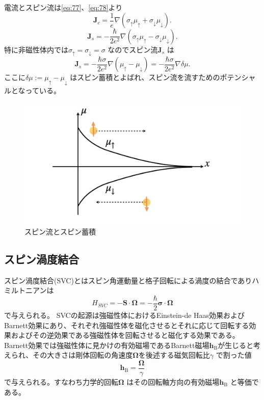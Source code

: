 \documentclass[dvipdfmx,11pt]{jsreport}
\numberwithin{equation}{chapter}
\numberwithin{table}{chapter}
\begin{document}
電流とスピン流は\eqref{eq:77}、\eqref{eq:78}より
\begin{equation}
\label{eq:86}
	\bm{J}_c=\frac{1}{e}\nabla (\sigma_{\uparrow}\mu_{\uparrow}+\sigma_{\downarrow}\mu_{\downarrow})
.\end{equation}
\begin{equation}
\label{eq:87}
	\bm{J}_s=-\frac{\hbar}{2e^2}\nabla (\sigma_{\uparrow}\mu_{\uparrow}-\sigma_{\downarrow}\mu_{\downarrow})
.\end{equation}
特に非磁性体内では$\sigma_{\uparrow}=\sigma_{\downarrow}=\sigma$ なのでスピン流$\bm{J}_{s}$ は
\begin{equation}
\label{eq:88}
	\bm{J}_s=-\frac{\hbar\sigma}{2e^2}\nabla (\mu_{\uparrow}-\mu_{\downarrow})=-\frac{\hbar\sigma}{2e^2}\nabla \delta\mu
.\end{equation}
ここに$\delta\mu:=\mu_{\uparrow}-\mu_{\downarrow}$ はスピン蓄積とよばれ、スピン流を流すためのポテンシャルとなっている。

\begin{figure}[H]
	\centering
	\includegraphics[width=\textwidth]{fig/fig.006.jpeg}
	\caption{スピン流とスピン蓄積}
	\label{fig:fig-fig-006-jpeg}
\end{figure}
\subsection{スピン渦度結合}
スピン渦度結合(SVC)とはスピン角運動量と格子回転による渦度の結合でありハミルトニアンは
\begin{equation}
\label{eq:s1}
	H_{SVC}=-\bm{S}\cdot \bm{\Omega}=-\frac{\hbar}{2}\bm{\sigma}\cdot \bm{\Omega}
\end{equation}
で与えられる。
SVCの起源は強磁性体におけるEinstein-de Haas効果およびBarnett効果にあり、それぞれ強磁性体を磁化させるとそれに応じて回転する効果およびその逆効果である強磁性体を回転させると磁化する効果である。
Barnett効果では強磁性体に見かけの有効磁場であるBarnett磁場$\bm{h}_\text{B} $が生じると考えられ、その大きさは剛体回転の角速度$\bm{\Omega}$を後述する磁気回転比$\gamma$ で割った値
\begin{equation}
\label{eq:s2}
	\bm{h}_\text{B} =\frac{\bm{\Omega}}{\gamma}
\end{equation}
で与えられる。すなわち力学的回転$\bm{\Omega}$ はその回転軸方向の有効磁場$\bm{h}_\text{B} $ と等価である。
\end{document}
